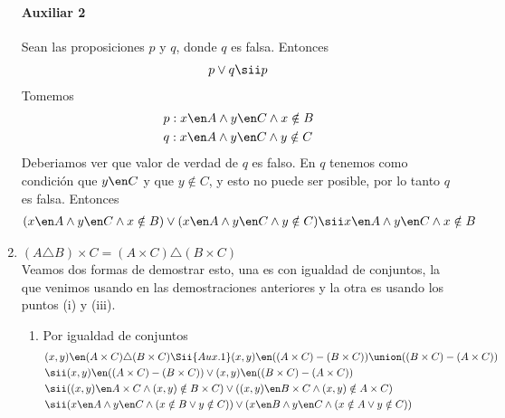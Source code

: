 \begin{enumerate}[label=\roman*)]
        \paragraph{Auxiliar 2}{
          Sean las proposiciones $p$ y $q$, donde $q$ es falsa. Entonces
          \begin{align*}
            p \lor q \sii p
          \end{align*}
          Tomemos
          \begin{align*}
             & p: x \en A \land y \en C \land x \notin B \\
             & q: x \en A \land y \en C \land y \notin C
          \end{align*}
          Deberiamos ver que valor de verdad de $q$ es falso. En $q$ tenemos como condición que $y \en C$ y que $y \notin C$,
          y esto no puede ser posible, por lo tanto $q$ es falsa. Entonces
          \begin{align*}
            (x \en A \land y \en C \land x \notin B) \lor (x \en A \land y \en C \land y \notin C)
            \sii x \en A \land y \en C \land x \notin B
          \end{align*}
        }
  \item $(A \triangle B) \times C = (A \times C) \triangle (B \times C)$ \\
        Veamos dos formas de demostrar esto, una es con igualdad de conjuntos, la que venimos usando en las demostraciones
        anteriores y la otra es usando los puntos (i) y (iii).
        \begin{enumerate}
          \item Por igualdad de conjuntos
                \begin{align*}
                   & (x,y) \en (A \times C) \triangle (B \times C)
                  \Sii{Aux.1} (x,y) \en ((A \times C) - (B \times C)) \union ((B \times C) - (A \times C))       \\
                   & \sii (x,y) \en ((A \times C) - (B \times C)) \lor (x,y) \en ((B \times C) - (A \times C))   \\
                   & \sii ((x,y) \en A \times C \land (x,y) \notin B \times C)
                  \lor ((x,y) \en B \times C \land (x,y) \notin A \times C)                                      \\
                   & \sii (x \en A \land y \en C \land (x \notin B \lor y \notin C))
                  \lor (x \en B \land y \en C \land (x \notin A \lor y \notin C))                                \\

\end{align*}
\end{enumerate}
\end{enumerate}
